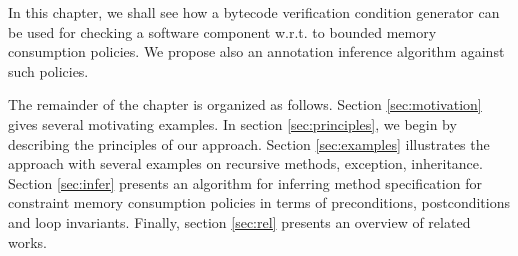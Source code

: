 In this chapter, we shall see how a bytecode verification condition generator can be used 
for checking a software component w.r.t. to bounded memory consumption policies.
We  propose also an annotation inference algorithm against such policies.


The remainder of the chapter is organized as follows. 
Section \ref{sec:motivation} gives several motivating examples.
In section \ref{sec:principles},  we begin by describing the principles of our
approach. Section \ref{sec:examples} illustrates the approach with several examples on recursive methods, exception, inheritance.
Section \ref{sec:infer} presents an algorithm for inferring method specification for constraint memory consumption policies 
in terms of preconditions, postconditions and loop invariants. 
Finally, section \ref{sec:rel} presents an overview of related works.
